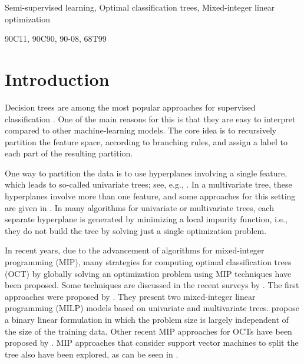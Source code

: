 \documentclass[a4paper,american,reqno]{amsart}
\newcommand{\rev}[1]{#1}
\begin{document}
Semi-supervised learning,
Optimal classification trees,
Mixed-integer linear optimization%
%
%

90C11,
90C90,
90-08,
68T99%
%
%

\maketitle

\section{Introduction}
\label{sec:introduction}

Decision trees are among the most popular approaches for supervised
classification \parencite{CART,Dtquilann}.
One of the main reasons for this is that they are easy to interpret
compared to other machine-learning models.
The core idea is to recursively partition the feature space, according
to branching rules, and assign a label to each \rev{part of the
  resulting partition}.

One way to partition the data is to use hyperplanes involving a
single feature, which leads to so-called univariate trees; see,
e.g., \textcite{univariateparallel, univariatehybrid}.
In a multivariate tree, these hyperplanes involve more than one
feature, and some approaches for this setting are given in
\textcite{multi1,bennett1996optimal,multi3}.
In many algorithms for univariate or multivariate trees, each separate
hyperplane is generated by minimizing a local impurity function, i.e.,
they do not build the tree by solving just a single optimization problem.

In recent years, due to the advancement of algorithms for
mixed-integer programming (MIP), many strategies for computing optimal
classification trees (OCT) by globally solving an optimization problem
using MIP techniques have been proposed.
Some techniques are discussed in the recent surveys by
\textcite{survey1,survey2}.
The first approaches were proposed by \textcite{Bertsimas2017}.
They present two mixed-integer linear programming (MILP) models based
on univariate and multivariate trees.
\textcite{10.1609/aaai.v33i01.33011624} propose a binary linear
formulation in which the problem size is largely independent of the
size of the training data.
\rev{Other recent MIP approaches for OCTs have been proposed by
  \textcite{Liu-et-al:2024,Aghaei-et-al:2025,Ales-et-al:2024}.}
MIP approaches that consider support vector machines
\parencite{cortes1995support} to split the tree also have been
explored, as can be seen in
\textcite{SVMDT2,maximumdist,donofrio2023margin}.
\end{document}
